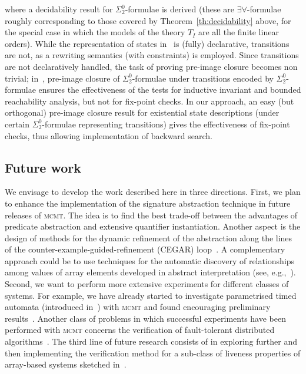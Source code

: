 \documentclass{LMCS}
\theoremstyle{plain}\newtheorem{assumption}[thm]{Assumption}
\theoremstyle{plain}\newtheorem{proposition}[thm]{Proposition}
\theoremstyle{plain}\newtheorem{property}[thm]{Property}
\theoremstyle{plain}\newtheorem{example}[thm]{Example}
\theoremstyle{plain}\newtheorem{claim}[thm]{Claim}
\theoremstyle{plain}\newtheorem{lemma}[thm]{Lemma}
\begin{document}
where a decidability result for $\Sigma^0_2$-formulae is derived
(these are $\exists\forall$-formulae roughly corresponding to those
covered by Theorem~\ref{th:decidability} above, for the special case
in which the models of the theory $T_I$ are all the finite linear
orders).  While the representation of states in~\cite{bouajjani-rew}
is (fully) declarative, transitions are not, as a rewriting semantics
(with constraints) is employed.  Since transitions are not
declaratively handled, the task of proving pre-image closure becomes
non trivial;
in~\cite{bouajjani-rew}, pre-image closure of $\Sigma^0_2$-formulae
under transitions encoded by $\Sigma^0_2$-formulae ensures the
effectiveness of the tests for inductive invariant and bounded
reachability analysis, but not for fix-point checks.  In our approach,
an easy (but orthogonal) pre-image closure result for existential
state descriptions (under certain $\Sigma^0_2$-formulae representing
transitions) gives the effectiveness of fix-point checks, thus
allowing implementation of backward search.

\subsection{Future work}

We envisage to develop the work described here in three directions.
First, we plan to enhance the implementation of the signature
abstraction technique in future releases of \textsc{mcmt}.  The idea
is to find the best trade-off between the advantages of predicate
abstraction and extensive quantifier instantiation.  Another aspect is
the design of methods for the dynamic refinement of the abstraction
along the lines of the counter-example-guided-refinement (CEGAR)
loop~\cite{seminal}.
A complementary approach could be to use techniques for the automatic
discovery of relationships among values of array elements developed in
abstract interpretation (see, e.g.,~\cite{popl05}).  Second, we want
to perform more extensive experiments for different classes of
systems.  For example, we have already started to investigate
parametrised timed automata (introduced in~\cite{AbdullaTCS}) with
\textsc{mcmt} and found encouraging preliminary results~\cite{verify}.
Another class of problems in which successful experiments have been
performed with \textsc{mcmt} concerns the verification of
fault-tolerant distributed
algorithms~\cite{Francesco1,Francesco2}.
The third line of future research consists of in exploring further and
then implementing the verification method for a sub-class of liveness
properties of array-based systems sketched in~\cite{ijcar08}.
\end{document}
